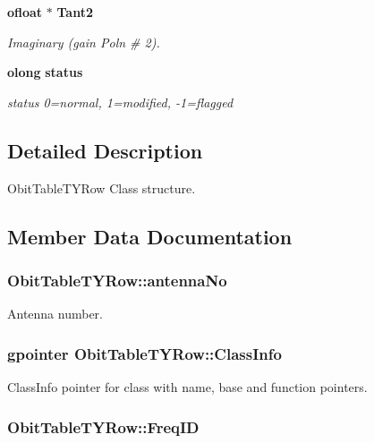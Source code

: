 \begin{CompactItemize}
{\bf ofloat} $\ast$ {\bf Tant2}
\begin{CompactList}\small\item\em Imaginary (gain Poln \# 2). \item\end{CompactList}\item 
{\bf olong} {\bf status}
\begin{CompactList}\small\item\em status 0=normal, 1=modified, -1=flagged \item\end{CompactList}\end{CompactItemize}


\subsection{Detailed Description}
Obit\-Table\-TYRow Class structure. 



\subsection{Member Data Documentation}
\subsubsection{ {\bf Obit\-Table\-TYRow::antenna\-No}}\label{structObitTableTYRow_o9}


Antenna number. 

\subsubsection{\setlength{\rightskip}{0pt plus 5cm}gpointer {\bf Obit\-Table\-TYRow::Class\-Info}}\label{structObitTableTYRow_o1}


Class\-Info pointer for class with name, base and function pointers. 

\subsubsection{ {\bf Obit\-Table\-TYRow::Freq\-ID}}\label{structObitTableTYRow_o11}


